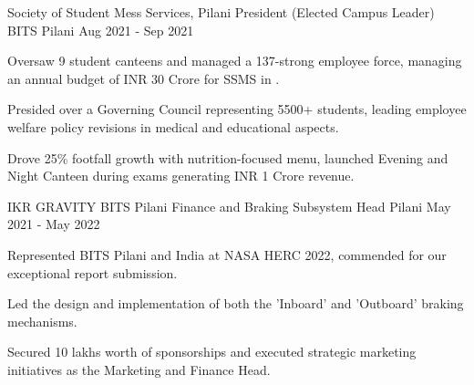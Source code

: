 

\begin{cventries}

  \cventry
    {Society of Student Mess Services, Pilani} %
    {President (Elected Campus Leader)} %
    {BITS Pilani} %
    {Aug 2021 - Sep 2021} %
    {
      \begin{cvitems} %
        \item {Oversaw 9 student canteens and managed a 137-strong employee force, managing an annual budget of INR 30 Crore for SSMS in .}
        \item {Presided over a Governing Council representing 5500+ students, leading employee welfare policy revisions in medical and educational aspects.}
        \item {Drove 25\% footfall growth with nutrition-focused menu, launched Evening and Night Canteen during exams generating INR 1 Crore revenue.}
      \end{cvitems}
    }


  \cventry 
    {IKR GRAVITY BITS Pilani} %
    {Finance and Braking Subsystem Head} %
    {Pilani} %
    {May 2021 - May 2022} %
    {
      \begin{cvitems} %
        \item {Represented BITS Pilani and India at NASA HERC 2022, commended for our exceptional report submission.}
        \item {Led the design and implementation of both the 'Inboard' and 'Outboard' braking mechanisms.}
        \item {Secured 10 lakhs worth of sponsorships and executed strategic marketing initiatives as the Marketing and Finance Head.}
      \end{cvitems}
    }


\end{cventries}
